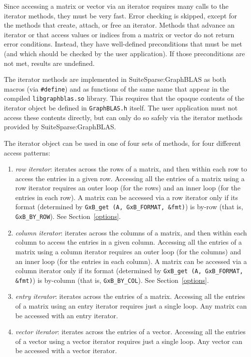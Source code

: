 \documentclass[12pt]{article}
\begin{document}
Since accessing a matrix or vector via an iterator requires many calls to
the iterator methods, they must be very fast.  Error checking is skipped,
except for the methods that create, attach, or free an iterator.  Methods
that advance an iterator or that access values or indices from a matrix or
vector do not return error conditions.  Instead, they have well-defined
preconditions that must be met (and which should be checked by the user
application).  If those preconditions are not met, results are undefined.

The iterator methods are implemented in SuiteSparse:GraphBLAS as both macros
(via \verb'#define') and as functions of the same name that appear in the
compiled \verb'libgraphblas.so' library.  This requires that the opaque
contents of the iterator object be defined in \verb'GraphBLAS.h' itself.  The
user application must not access these contents directly, but can only do so
safely via the iterator methods provided by SuiteSparse:GraphBLAS.

The iterator object can be used in one of four sets of methods,
for four different access patterns:

    \begin{enumerate}
    \item {\em row iterator}:  iterates across the rows of a matrix, and then
        within each row to access the entries in a given row.  Accessing all
        the entries of a matrix using a row iterator requires an outer loop
        (for the rows) and an inner loop (for the entries in each row).
        A matrix can be accessed via a row iterator only if its format
        (determined by \verb'GxB_get (A, GxB_FORMAT, &fmt)') is by-row
        (that is, \verb'GxB_BY_ROW').
        See Section~\ref{options}.
    \item {\em column iterator}:  iterates across the columns of a matrix, and
        then within each column to access the entries in a given column.
        Accessing all the entries of a matrix using a column iterator requires
        an outer loop (for the columns) and an inner loop (for the entries in
        each column).  A matrix can be accessed via a column iterator only if
        its format (determined by \verb'GxB_get (A, GxB_FORMAT, &fmt)') is
        by-column (that is, \verb'GxB_BY_COL').
        See Section~\ref{options}.
    \item {\em entry iterator}:  iterates across the entries of a matrix.
        Accessing all the entries of a matrix using an entry iterator requires
        just a single loop.  Any matrix can be accessed with an entry iterator.
    \item {\em vector iterator}:  iterates across the entries of a vector.
        Accessing all the entries of a vector using a vector iterator requires
        just a single loop.  Any vector can be accessed with a vector iterator.
    \end{enumerate}
\end{document}
